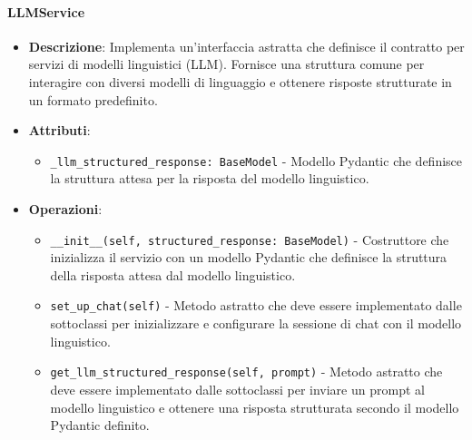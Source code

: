 \documentclass[10pt]{article}
\begin{document}
    \paragraph{LLMService}
    \begin{itemize} 
    \item \textbf{Descrizione}: Implementa un'interfaccia astratta che definisce il contratto per servizi di modelli linguistici (LLM). Fornisce una struttura comune per interagire con diversi modelli di linguaggio e ottenere risposte strutturate in un formato predefinito.
    \item \textbf{Attributi}:
    \begin{itemize}
        \item \texttt{\_llm\_structured\_response: BaseModel} - Modello Pydantic che definisce la struttura attesa per la risposta del modello linguistico.
    \end{itemize}
    
    \item \textbf{Operazioni}:
    \begin{itemize}
        \item \texttt{\_\_init\_\_(self, structured\_response: BaseModel)} - Costruttore che inizializza il servizio con un modello Pydantic che definisce la struttura della risposta attesa dal modello linguistico.
        
        \item \texttt{set\_up\_chat(self)} - Metodo astratto che deve essere implementato dalle sottoclassi per inizializzare e configurare la sessione di chat con il modello linguistico.
        
        \item \texttt{get\_llm\_structured\_response(self, prompt)} - Metodo astratto che deve essere implementato dalle sottoclassi per inviare un prompt al modello linguistico e ottenere una risposta strutturata secondo il modello Pydantic definito.
    \end{itemize}
    \end{itemize}
\end{document}
